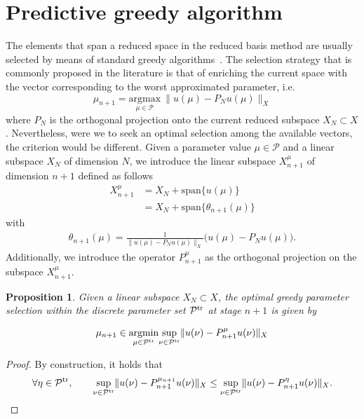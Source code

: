 \documentclass[12pt,a4paper]{article}
\newtheorem{proposition}{Proposition}
\newcommand{\tr}{{\rm tr}}
\newcommand{\calP}{\mathcal P}
\begin{document}
\section{Predictive greedy algorithm}
The elements that span a reduced space in the reduced basis method
 are usually selected by means of standard greedy algorithms~\cite{pate,haasdonk13}.
The selection strategy that is commonly proposed in the literature is that of enriching the current space with the vector corresponding to the worst approximated parameter, i.e.
 \begin{equation}\label{std_greedy}
  \mu_{n+1} = \underset{\mu \in \mathcal P}{\mathrm{argmax}}\ \|u(\mu)-P_N u(\mu)\|_X
 \end{equation}
where $P_N$ is the orthogonal projection onto the current reduced subspace $X_{N}\subset X$.
 Nevertheless, were we to seek an optimal selection among the available vectors, the criterion would be different.
 Given a parameter value $\mu\in\calP$ and a linear subspace $X_N$ of dimension $N$, we introduce the linear subspace $X^\mu_{n+1}$ of dimension $n+1$ defined as follows 
\begin{align*}
X^\mu_{n+1} &= X_N + \mathrm{span}\{u(\mu)\} \\
&=X_N + \mathrm{span}\{\theta_{n+1}(\mu)\} 
\end{align*}
with
\begin{align*}
\theta_{n+1}(\mu) = \frac{1}{\| u(\mu) - P_N u(\mu) \|_X} \big( u(\mu) - P_N u(\mu) \big).
\end{align*}
Additionally, we introduce the operator $P^\mu_{n+1}$ as the orthogonal projection on the subspace $X^\mu_{n+1}$.
 
 \begin{proposition}
Given a linear subspace $X_N\subset X$, the optimal greedy parameter selection within the discrete parameter set $\calP^\tr$ at stage $n+1$ is given by
\end{proposition}
 \begin{equation}\label{mod_greedy}
  \mu_{n+1} \in \underset{\mu \in \calP^\tr}{\mathrm{argmin}} \underset{\nu \in \calP^\tr} {\mathrm{\ sup\ }}\|u(\nu)- P^\mu_{n+1} u(\nu)\|_X
 \end{equation}

\begin{proof}
By construction, it holds that 
$$
\forall \eta\in\calP^\tr, \qquad\underset{\nu \in \calP^\tr} {\mathrm{\ sup\ }}\|u(\nu)- P^{\mu_{n+1}}_{n+1} u(\nu)\|_X
\leq
\underset{\nu \in \calP^\tr} {\mathrm{\ sup\ }} \|u(\nu)- P^\eta_{n+1} u(\nu)\|_X.
$$
\end{proof}
\end{document}
